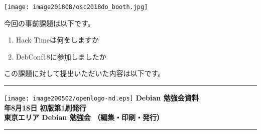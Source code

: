 \documentclass[mingoth,a4paper]{jsarticle}
\newcommand{\debmtgyear}{2018}
\newcommand{\debmtgmonth}{8}
\newcommand{\debmtgdate}{18}
\begin{document}
\begin{center}
  \texttt{[image: image201808/osc2018do\_booth.jpg]}
\end{center}


今回の事前課題は以下です。

\begin{enumerate}
\item Hack Timeは何をしますか
\item DebConf18に参加しましたか
\end{enumerate}

この課題に対して提出いただいた内容は以下です。

\begin{multicols}{2}
{\small

}
\end{multicols}

%
%
%
%







%
\mbox{}\newpage

\vspace*{15cm}
\hrule
\vspace{2mm}
\texttt{[image: image200502/openlogo-nd.eps]}
\noindent \Large \bf Debian 勉強会資料\\
\noindent \normalfont \debmtgyear{}年\debmtgmonth{}月\debmtgdate{}日 \hspace{5mm}  初版第1刷発行\\
\noindent \normalfont 東京エリア Debian 勉強会 （編集・印刷・発行）\\
\hrule
\end{document}
